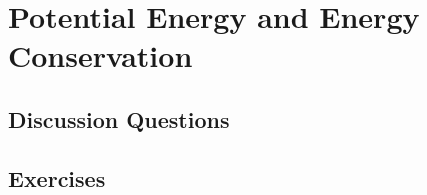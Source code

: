 
\chapter{Potential Energy and Energy Conservation}

\section{Discussion Questions}

\section{Exercises}
